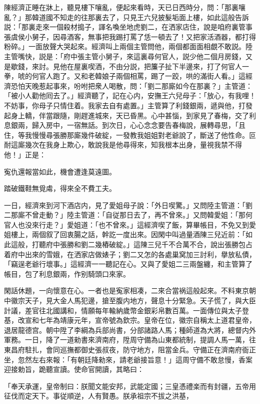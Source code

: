 陳經濟正睡在牀上，聽見樓下嚷亂，便起來看時，天已日西時分，問：「那裏嚷亂？」那韓道國不知走的往那裏去了，只見王六兒披髮垢面上樓，如此這般告訴説：「那裏走來一個殺材搗子，諢名喚坐地虎劉二，在洒家店住，說是咱府裏管事張虞侯小舅子，因尋酒客，無事把我踢打罵了恁一頓去了！又把家活酒器，都打得粉碎。」一面放聲大哭起來。經濟叫上兩個主管問他，兩個都面面相覷不敢説。陸主管嘴快，説是：「府中張主管小舅子，來這裏尋何官人，説少他二個月房錢，又是歇錢，來討。見他在屋裏喫酒，不由分説，把簾子扯下半邊來，打了何官人一拳，唬的何官人跑了。又和老韓娘子兩個相罵，踢了一跤，哄的滿街人看。」這經濟恐怕天晚惹起事來，吩咐把衆人喝散，問：「劉二那廝如今在那裏？」主管道：「被小人勸他囘去了。」經濟聽了，記在心内，安撫王六兒母子：「放心，有我哩！不妨事，你母子只情住着。我家去自有處置。」主管算了利錢銀兩，遞與他，打發起身上轎，伴當跟隨，剛趕進城來，天已昏黑。心中甚惱，到家見了春梅，交了利息銀兩，歸入房中，一宿無話。到次日，心心念念要告春梅說，展轉尋思，「且住，等我慢慢尋張勝那廝幾件破綻，一發教我姐姐對老爺說了，斷送了他性命。叵耐這廝幾次在我身上欺心，敢說我是他尋得來，知我根本出身，量視我禁不得他！」正是：

寃仇還報當如此，機會遭逢莫遠圖。

踏破鐵鞋無覓䖏，得來全不費工夫。

一日，經濟來到河下酒店内，見了愛姐母子說：「外日喫驚。」又問陸主管道：「劉二那廝不曾走動？」陸主管道：「自従那日去了，再不曾來。」又問韓愛姐：「那何官人也没來行走？」愛姐道：「也不曾來。」這經濟喫了飯，算畢帳目，不免又到愛姐樓上，兩個叙了回衷腸之話，幹訖一度出來。因閑中叫過量酒陳三兒近前：「如此這般，打聽府中張勝和劉二幾樁破綻。」這陳三兒千不合萬不合，說出張勝包占着府中出來的雪娥，在洒家店做婊子；劉二又怎的各處巢窝加三討利，擧放私債，「竊逞老爺行壞事。」這經濟一一聽記在心。又與了愛姐二三兩盤纏，和主管算了帳目，包了利息銀兩，作别騎頭口來家。

閑話休題，一向懷意在心。一者也是寃家相凑，二來合當祸這般起來。不料東京朝中徽宗天子，見大金人馬犯邊，搶至腹内地方，聲息十分緊急。天子慌了，與大臣計議，差官往北國講和，情願每年輸納歲幣金銀彩帛數百萬。一面傳位與太子登基，改宣和七年為靖康元年，宣帝號為欽宗。皇帝在位，徽宗自稱太上道君皇帝，退居龍德宫。朝中陞了李綱為兵部尚書，分部諸路人馬；種師道為大將，總督内外軍務。一日，降了一道勑書來濟南府，陞周守備為山東都統制，提調人馬一萬，往東昌府駐扎，會同巡撫都御史張叔夜，防守地方，阻當金兵。守備正在濟南府衙正坐，忽然左右來報：「有朝廷降勑來，請老爺接旨意！」這周守備不敢怠慢，香案迎接勅旨，跪聽宣讀。使命官開讀，其略曰：

「奉天承運，皇帝制曰：朕聞文能安邦，武能定國；三皇憑禮楽而有封疆，五帝用征伐而定天下。事従順逆，人有賢愚。朕承祖宗不拔之洪基，

